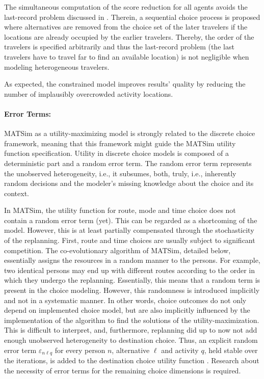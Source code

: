 The simultaneous computation of the score reduction for all agents avoids the last-record problem discussed in \citet[][]{VovshaEtAl_TRR_2002}. Therein, a sequential choice process is proposed where alternatives are removed from the choice set of the later travelers if the locations are already occupied by the earlier travelers. Thereby, the order of the travelers is specified arbitrarily and thus the last-record problem (the last travelers have to travel far to find an available location) is not negligible when modeling heterogeneous travelers. 

As expected, the constrained model improves results' quality by reducing the number of implausibly overcrowded activity locations.

\paragraph{Error Terms:}
MATSim as a utility-maximizing model is strongly related to the discrete choice framework, meaning that this framework might guide the MATSim utility function specification. Utility in discrete choice models is composed of a deterministic part and a random error term. The random error term represents the unobserved heterogeneity, i.e., it subsumes, both, truly, i.e., inherently random decisions and the modeler's missing knowledge about the choice and its context. 

In MATSim, the utility function for route, mode and time choice does not contain a random error term (yet). This can be regarded as a shortcoming of the model. However, this is at least partially compensated through the stochasticity of the replanning. First, route and time choices are usually subject to significant competition. The co-evolutionary algorithm of MATSim, detailed below, essentially assigns the resources in a random manner to the persons. For example, two identical persons may end up with different routes according to the order in which they undergo the replanning. Essentially, this means that a random term is present in the choice modeling. However, this randomness is introduced implicitly and not in a systematic manner. In other words, choice outcomes do not only depend on implemented choice model, but are also implicitly influenced by the implementation of the algorithm to find the solutions of the utility-maximization. This is difficult to interpret, and, furthermore, replanning did up to now not add enough unobserved heterogeneity to destination choice. Thus, an explicit random error term $\varepsilon_{n\ell q}$ for every person $n$, alternative $\ell$ and activity $q$, held stable over the iterations, is added to the destination choice utility function \citep[][]{Horni_PhDThesis_2013}. Research about the necessity of error terms for the remaining choice dimensions is required.

